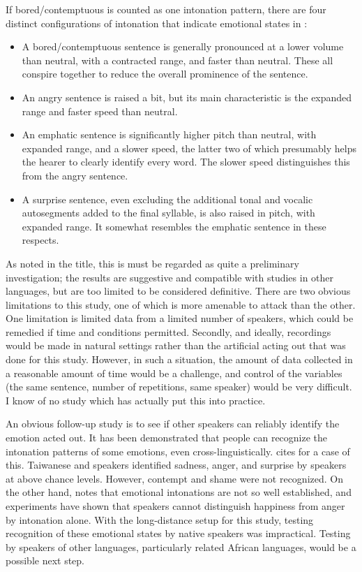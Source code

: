 \documentclass[output=paper]{langsci/langscibook}
\begin{document}
If bored/contemptuous is counted as one intonation pattern, there are four distinct configurations of intonation that indicate emotional states in :

\begin{itemize}
\item A bored/contemptuous sentence is generally pronounced at a lower volume than neutral, with a contracted range, and faster than neutral. These all conspire together to reduce the overall prominence of the sentence.
\item An angry sentence is raised a bit, but its main characteristic is the expanded range and faster speed than neutral.
\item An emphatic sentence is significantly higher pitch than neutral, with expanded range, and a slower speed, the latter two of which presumably helps the hearer to clearly identify every word. The slower speed distinguishes this from the angry sentence.
\item A surprise sentence, even excluding the additional tonal and vocalic autosegments added to the final syllable, is also raised in pitch, with expanded range. It somewhat resembles the emphatic sentence in these respects. 
\end{itemize}

As noted in the title, this is must be regarded as quite a preliminary investigation; the results are suggestive and compatible with studies in other languages, but are too limited to be considered definitive. There are two obvious limitations to this study, one of which is more amenable to attack than the other. One limitation is limited data from a limited number of speakers, which could be remedied if time and conditions permitted. Secondly, and ideally, recordings would be made in natural settings rather than the artificial acting out that was done for this study. However, in such a situation, the amount of data collected in a reasonable amount of time would be a challenge, and control of the variables (the same sentence, number of repetitions, same speaker) would be very difficult. I know of no study which has actually put this into practice.

An obvious follow-up study is to see if other  speakers can reliably identify the emotion acted out. It has been demonstrated that people can recognize the intonation patterns of some emotions, even cross-linguistically. \citet[72]{gussenhoven2004} cites \citet[128]{vanbezooijen1984} for a case of this. Taiwanese and  speakers identified sadness, anger, and surprise by  speakers at above chance levels. However, contempt and shame were not recognized. On the other hand, \citet[12]{garding1998} notes that  emotional intonations are not so well established, and experiments have shown that  speakers cannot distinguish happiness from anger by intonation alone. With the long-distance setup for this study, testing recognition of these emotional states by native  speakers was impractical. Testing by speakers of other languages, particularly related African languages, would be a possible next step.
\end{document}
